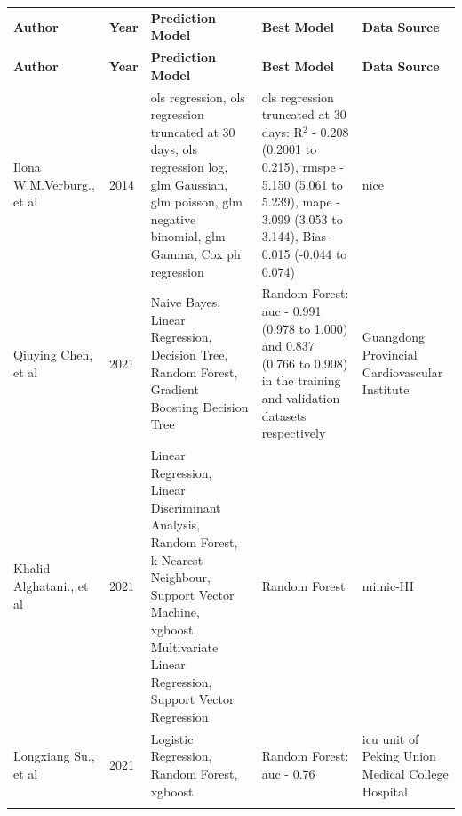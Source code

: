 \documentclass[11pt]{article}
\begin{document}
{\seriffont
{\small
\renewcommand{\arraystretch}{1}
\centering
\begin{center}
\setlength{\arrayrulewidth}{0.7mm}
\begin{longtable}{ |L{2cm} | L{1cm} | L{4cm} | 
 L{6cm} | L{2cm} |} 
    \hline
    \textbf{Author} & \textbf{Year} & \textbf{Prediction Model} & \textbf{Best Model}
 & \textbf{Data Source} \\ 
    \noalign{\global\setlength{\arrayrulewidth}{0.7mm}}
    \hline
    \endfirsthead

\hline
\textbf{Author} & \textbf{Year} & \textbf{Prediction Model} & \textbf{Best Model} 
 & \textbf{Data Source} \\
\hline
\endhead
  Ilona W.M.Verburg., et al \cite{Verburg2014} & 2014 & \gls{ols} regression, \gls{ols} regression truncated at 30 days, \gls{ols} regression log, \gls{glm} Gaussian, \gls{glm} poisson, \gls{glm} negative binomial, \gls{glm} Gamma, Cox \gls{ph} regression & \gls{ols} regression truncated at 30 days: R$^2$ - 0.208 (0.2001 to 0.215), \gls{rmspe} - 5.150 (5.061 to 5.239), \gls{mape} - 3.099 (3.053 to 3.144), Bias - 0.015 (-0.044 to 0.074) & \gls{nice}\\ 
    \noalign{\global\setlength{\arrayrulewidth}{0.05mm}}
    \hline
    \noalign{\global\setlength{\arrayrulewidth}{0.7mm}}
  Qiuying Chen, et al \cite{Das2021}  & 2021 & Naive Bayes, Linear Regression, Decision Tree, Random Forest, Gradient Boosting Decision Tree & Random Forest: \gls{auc} - 0.991 (0.978 to 1.000) and 0.837 (0.766 to 0.908) in the training and validation datasets respectively &
 Guangdong Provincial Cardiovascular Institute \\ 
    \noalign{\global\setlength{\arrayrulewidth}{0.05mm}}
    \hline
    \noalign{\global\setlength{\arrayrulewidth}{0.7mm}}
 Khalid Alghatani., et al \cite{Alghatani2021} & 2021 & Linear Regression, Linear Discriminant Analysis, Random Forest, k-Nearest Neighbour, Support Vector Machine, \gls{xgboost}, Multivariate Linear Regression, Support Vector Regression & Random Forest &
\gls{mimic}-III \\ 
    \noalign{\global\setlength{\arrayrulewidth}{0.05mm}}
    \hline
    \noalign{\global\setlength{\arrayrulewidth}{0.7mm}}
 Longxiang Su., et al \cite{Relja2021}  & 2021 & Logistic Regression, Random Forest, \gls{xgboost} & Random Forest: \gls{auc} - 0.76 & 
\gls{icu} unit of Peking Union Medical College Hospital \\ 
    \noalign{\global\setlength{\arrayrulewidth}{0.05mm}}
    \hline
    \noalign{\global\setlength{\arrayrulewidth}{0.7mm}}

\end{longtable}
\end{center}}}
\end{document}
